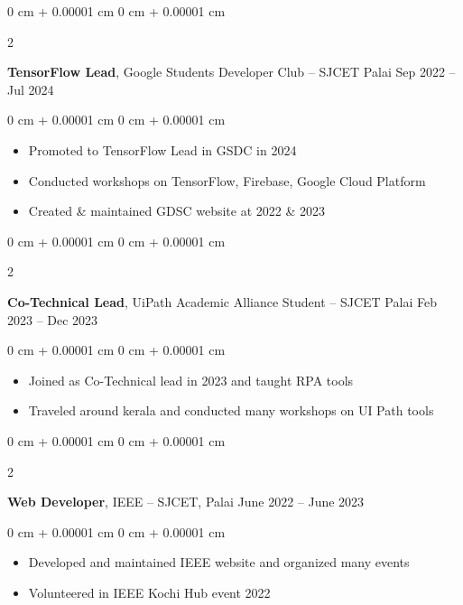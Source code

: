 \documentclass[10pt, letterpaper]{article}
\newenvironment{highlights}{
    \begin{itemize}[
        topsep=0.10 cm,
        parsep=0.10 cm,
        partopsep=0pt,
        itemsep=0pt,
        leftmargin=0 cm + 10pt
    ]
}{
    \end{itemize}
} %
\newenvironment{onecolentry}{
    \begin{adjustwidth}{
        0 cm + 0.00001 cm
    }{
        0 cm + 0.00001 cm
    }
}{
    \end{adjustwidth}
} %
\newenvironment{twocolentry}[2][]{
    \onecolentry
    \def\secondColumn{#2}
    \setcolumnwidth{\fill, 4.5 cm}
    \begin{paracol}{2}
}{
    \switchcolumn \raggedleft \secondColumn
    \end{paracol}
    \endonecolentry
} %
\begin{document}
\vspace{0.2 cm}

\begin{twocolentry}{
		Sep 2022 – Jul 2024
	}
	\textbf{TensorFlow Lead}, Google Students Developer Club -- SJCET Palai\end{twocolentry}

\vspace{0.10 cm}
\begin{onecolentry}
	\begin{highlights}
		\item Promoted to TensorFlow Lead in GSDC in 2024
		\item Conducted workshops on TensorFlow, Firebase, Google Cloud Platform
		\item Created \& maintained GDSC website at 2022 \& 2023
	\end{highlights}
\end{onecolentry}

\vspace{0.2 cm}

\begin{twocolentry}{
		Feb 2023 – Dec 2023
	}
	\textbf{Co-Technical Lead}, UiPath Academic Alliance Student -- SJCET Palai\end{twocolentry}

\vspace{0.10 cm}
\begin{onecolentry}
	\begin{highlights}
		\item Joined as Co-Technical lead in 2023 and taught RPA tools
		\item Traveled around kerala and conducted many workshops on UI Path tools
	\end{highlights}
\end{onecolentry}

\vspace{0.2 cm}

\begin{twocolentry}{
		June 2022 – June 2023
	}
	\textbf{Web Developer}, IEEE -- SJCET, Palai\end{twocolentry}

\vspace{0.10 cm}
\begin{onecolentry}
	\begin{highlights}
		\item Developed and maintained IEEE website and organized many events
		\item Volunteered in IEEE Kochi Hub event 2022
	\end{highlights}
\end{onecolentry}
\end{document}
